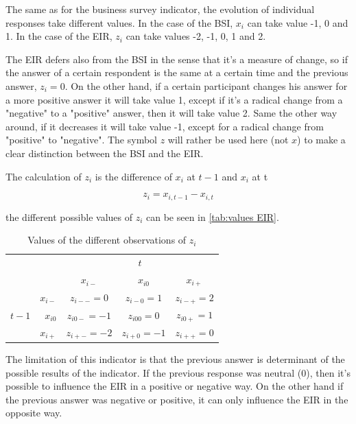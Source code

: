 \documentclass[12pt,a4paper,oneside]{book}
\begin{document}
The same as for the business survey indicator, the evolution of individual responses take different values. In the case of the BSI, $x_i$ can take value -1, 0 and 1. In the case of the EIR, $z_i$ can take values -2, -1, 0, 1 and 2.

The EIR defers also from the BSI in the sense that it's a measure of change, so if the answer of a certain respondent is the same at a certain time and the previous answer, $z_i=0$. 
On the other hand, if a certain participant changes his answer for a more positive answer it will take value 1, except if it's a radical change from a "negative" to a "positive" answer, then it will take value 2.
Same the other way around, if it decreases it will take value -1, except for a radical change from "positive" to "negative".
The symbol $z$ will rather be used here (not $x$) to make a clear distinction between the BSI and the EIR.

The calculation of $z_i$ is the difference of $x_i$ at $t-1$ and $x_i$ at t

\begin{equation}
    z_i = x_{i,t-1} - x_{i,t}
\end{equation}

the different possible values of $z_i$ can be seen in \autoref{tab:values EIR}. 

\begin{table}[htp!]
    \caption{Values of the different observations of $z_i$}
    \label{tab:values EIR}
    \centering \footnotesize
    \begin{tabular}{r | r | c c c | }
    \multicolumn{1}{r}{} & \multicolumn{1}{r}{} &    \multicolumn{3}{c}{$t$} \\ \cline{3-5}
    \multicolumn{1}{r}{} &         & \textbf{$x_{i-}$} & \textbf{$x_{i0}$} & \textbf{$x_{i+}$} \\ \cline{2-5}
           &    \textbf{$x_{i-}$} & $z_{i--}=0$    & $z_{i-0}=1$    & $z_{i-+}=2$ \\ 
    $t-1$ & \textbf{$x_{i0}$}  & $z_{i0-}=-1$    & $z_{i00}=0$    & $z_{i0+}=1$    \\
            & \textbf{$x_{i+}$}& $z_{i+-}=-2$    & $z_{i+0}=-1$    & $z_{i++}=0$ \\ \cline{2-5}
\end{tabular}
\end{table}


The limitation of this indicator is that the previous answer is determinant of the possible results of the indicator. 
If the previous response was neutral (0), then it's possible to influence the EIR in a positive or negative way. 
On the other hand if the previous answer was negative or positive, it can only influence the EIR in the opposite way.
\end{document}
